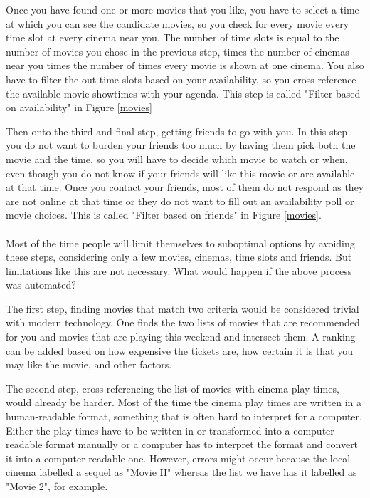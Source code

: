 \documentclass{article}
\begin{document}
 Once you have found one or more movies that you like, you have to select a time at which you can see the candidate movies, so you check for every movie every time slot at every cinema near you. The number of time slots is equal to the number of movies you chose in the previous step, times the number of cinemas near you times the number of times every movie is shown at one cinema. You also have to filter the out time slots based on your availability, so you cross-reference the available movie showtimes with your agenda. This step is called "Filter based on availability" in Figure \ref{movies}
 
 Then onto the third and final step, getting friends to go with you. In this step you do not want to burden your friends too much by having them pick both the movie and the time, so you will have to decide which movie to watch or when, even though you do not know if your friends will like this movie or are available at that time. Once you contact your friends, most of them do not respond as they are not online at that time or they do not want to fill out an availability poll or movie choices. This is called "Filter based on friends" in Figure \ref{movies}.
 \paragraph{}
 Most of the time people will limit themselves to suboptimal options by avoiding these steps, considering only a few movies, cinemas, time slots and friends. But limitations like this are not necessary. What would happen if the above process was automated?
 
The first step, finding movies that match two criteria would be considered trivial with modern technology. One finds the two lists of movies that are recommended for you and movies that are playing this weekend and intersect them. A ranking can be added based on how expensive the tickets are, how certain it is that you may like the movie, and other factors. 

 The second step, cross-referencing the list of movies with cinema play times, would already be harder. Most of the time the cinema play times are written in a human-readable format, something that is often hard to interpret for a computer. Either the play times have to be written in or transformed into a computer-readable format manually or a computer has to interpret the format and convert it into a computer-readable one. However, errors might occur because the local cinema labelled a sequel as "Movie II" whereas the list we have has it labelled as "Movie 2", for example.
 
\end{document}
